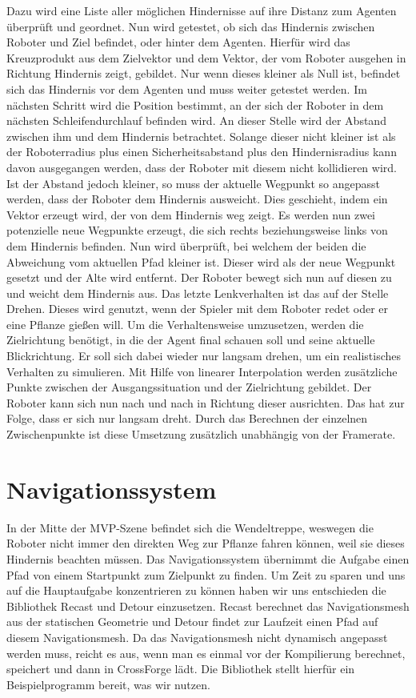 Dazu wird eine Liste aller möglichen Hindernisse auf ihre Distanz zum Agenten überprüft und geordnet. Nun wird getestet, ob sich das Hindernis zwischen Roboter und Ziel befindet, oder hinter dem Agenten. Hierfür wird das Kreuzprodukt aus dem Zielvektor und dem Vektor, der vom Roboter ausgehen in Richtung Hindernis zeigt, gebildet. Nur wenn dieses kleiner als Null ist, befindet sich das Hindernis vor dem Agenten und muss weiter getestet werden. Im nächsten Schritt wird die Position bestimmt, an der sich der Roboter in dem nächsten Schleifendurchlauf befinden wird. An dieser Stelle wird der Abstand zwischen ihm und dem Hindernis betrachtet. Solange dieser nicht kleiner ist als der Roboterradius plus einen Sicherheitsabstand plus den Hindernisradius kann davon ausgegangen werden, dass der Roboter mit diesem nicht kollidieren wird. Ist der Abstand jedoch kleiner, so muss der aktuelle Wegpunkt so angepasst werden, dass der Roboter dem Hindernis ausweicht. Dies geschieht, indem ein Vektor erzeugt wird, der von dem Hindernis weg zeigt. Es werden nun zwei potenzielle neue Wegpunkte erzeugt, die sich rechts beziehungsweise links von dem Hindernis befinden. Nun wird überprüft, bei welchem der beiden die Abweichung vom aktuellen Pfad kleiner ist. Dieser wird als der neue Wegpunkt gesetzt und der Alte wird entfernt. Der Roboter bewegt sich nun auf diesen zu und weicht dem Hindernis aus.
Das letzte Lenkverhalten ist das auf der Stelle Drehen. Dieses wird genutzt, wenn der Spieler mit dem Roboter redet oder er eine Pflanze gießen will. Um die Verhaltensweise umzusetzen, werden die Zielrichtung benötigt, in die der Agent final schauen soll und seine aktuelle Blickrichtung. Er soll sich dabei wieder nur langsam drehen, um ein realistisches Verhalten zu simulieren. Mit Hilfe von linearer Interpolation werden zusätzliche Punkte zwischen der Ausgangssituation und der Zielrichtung gebildet. Der Roboter kann sich nun nach und nach in Richtung dieser ausrichten. Das hat zur Folge, dass er sich nur langsam dreht. Durch das Berechnen der einzelnen Zwischenpunkte ist diese Umsetzung zusätzlich unabhängig von der Framerate.
\section{Navigationssystem}

In der Mitte der MVP-Szene befindet sich die Wendeltreppe, weswegen die Roboter nicht immer den direkten Weg zur Pflanze fahren können, weil sie dieses Hindernis beachten müssen. Das Navigationssystem übernimmt die Aufgabe einen Pfad von einem Startpunkt zum Zielpunkt zu finden. Um Zeit zu sparen und uns auf die Hauptaufgabe konzentrieren zu können haben wir uns entschieden die Bibliothek Recast und Detour einzusetzen. Recast berechnet das Navigationsmesh aus der statischen Geometrie und Detour findet zur Laufzeit einen Pfad auf diesem Navigationsmesh. Da das Navigationsmesh nicht dynamisch angepasst werden muss, reicht es aus, wenn man es einmal vor der Kompilierung berechnet, speichert und dann in CrossForge lädt. Die Bibliothek stellt hierfür ein Beispielprogramm bereit, was wir nutzen.

